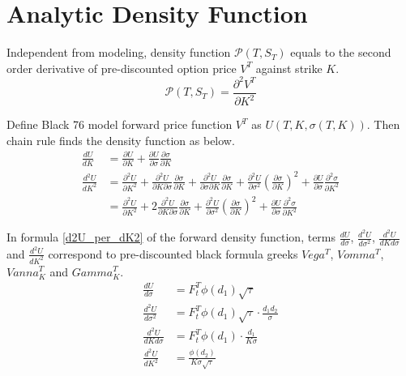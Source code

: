 \documentclass{article}
\begin{document}
\section{Analytic Density Function}

Independent from modeling, density function $ \mathcal{P}\left(T, S_T\right) $ equals to the second order derivative of pre-discounted option price $ V^T $ against strike $ K $.
\begin{equation}
    \mathcal{P}\left(T, S_T\right) = \frac{\partial^2 V^T}{\partial K^2}
\end{equation}

Define Black 76 model forward price function $ V^T $ as $ U\left(T, K, \sigma(T, K)\right) $.
Then chain rule finds the density function as below.
\begin{align}
    \frac{d U}{d K} &= \frac{\partial U}{\partial K} + \frac{\partial U}{\partial \sigma} \frac{\partial \sigma}{\partial K} \\
    \frac{d^2 U}{d K^2} &= \frac{\partial^2 U}{\partial K^2} + \frac{\partial^2 U}{\partial K \partial \sigma} \frac{\partial \sigma}{\partial K}  + \frac{\partial^2 U}{\partial \sigma \partial K} \frac{\partial \sigma}{\partial K} + \frac{\partial^2 U}{\partial \sigma^2} \left(\frac{\partial \sigma}{\partial K}\right)^2 + \frac{\partial U}{\partial \sigma} \frac{\partial^2 \sigma}{\partial K^2} \nonumber \\
    &= \frac{\partial^2 U}{\partial K^2} + 2 \frac{\partial^2 U}{\partial K \partial \sigma} \frac{\partial \sigma}{\partial K} + \frac{\partial^2 U}{\partial \sigma^2} \left(\frac{\partial \sigma}{\partial K}\right)^2 + \frac{\partial U}{\partial \sigma} \frac{\partial^2 \sigma}{\partial K^2} \label{d2U_per_dK2}
\end{align}

In formula \ref{d2U_per_dK2} of the forward density function, terms $ \frac{d U}{d \sigma} $, $ \frac{d^2 U}{d \sigma^2} $, $ \frac{d^2 U}{d K d \sigma} $ and $ \frac{d^2 U}{d K^2} $ correspond to pre-discounted black formula greeks $ Vega^T $, $ Vomma^T $, $ Vanna_{K}^T $ and $ Gamma_{K}^T $.
\begin{subequations}
    \begin{align}
        \frac{d U}{d \sigma} &= F_{t}^{T} \phi(d_1) \sqrt{\tau} \\
        \frac{d^2 U}{d \sigma^2} &= F_{t}^{T} \phi(d_1) \sqrt{\tau} \cdot \frac{d_1 d_2}{\sigma} \\
        \frac{d^2 U}{d K d \sigma} &= F_{t}^{T} \phi(d_1) \cdot \frac{d_1}{K \sigma} \\
        \frac{d^2 U}{d K^2} &= \frac{\phi(d_2)}{K \sigma \sqrt{\tau}}
    \end{align}
\end{subequations}
\end{document}
